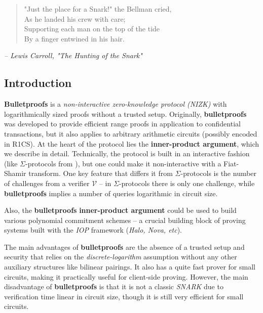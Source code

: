 \documentclass[../../book.tex]{subfiles}
\begin{document}
\begin{quote}
    \small "Just the place for a Snark!" the Bellman cried,\\
    As he landed his crew with care;\\
 Supporting each man on the top of the tide\\
    By a finger entwined in his hair.
\end{quote}
\begin{flushright}
\small \textit{-- Lewis Carroll, "The Hunting of the Snark"}
\end{flushright}

\subsection{Introduction}

\textbf{Bulletproofs} is a \textit{non-interactive zero-knowledge protocol (NIZK)} with logarithmically sized proofs without a trusted setup. Originally, \textbf{bulletproofs} was developed to provide efficient range proofs in application to confidential transactions, but it also applies to arbitrary arithmetic circuits (possibly encoded in R1CS). At the heart of the protocol lies the \textbf{inner-product argument}, which we describe in detail. Technically, the protocol is built in an interactive fashion (like $\Sigma$-protocols from ), but one could make it non-interactive with a Fiat-Shamir transform. One key feature that differs it from $\Sigma$-protocols is the number of challenges from a verifier $\mathcal{V}$ -- in $\Sigma$-protocols there is only one challenge, while \textbf{bulletproofs} implies a number of queries logarithmic in circuit size.

Also, the \textbf{bulletproofs} \textbf{inner-product argument} could be used to build various polynomial commitment schemes -- a crucial building block of proving systems built with the \textit{IOP} framework (\textit{Halo, Nova, etc}).

The main advantages of \textbf{bulletproofs} are the absence of a trusted setup and security that relies on the \textit{discrete-logarithm} assumption without any other auxiliary structures like bilinear pairings. It also has a quite fast prover for small circuits, making it practically useful for client-side proving. However, the main disadvantage of \textbf{bulletproofs} is that it is not a classic \textit{SNARK} due to verification time linear in circuit size, though it is still very efficient for small circuits.
\end{document}
